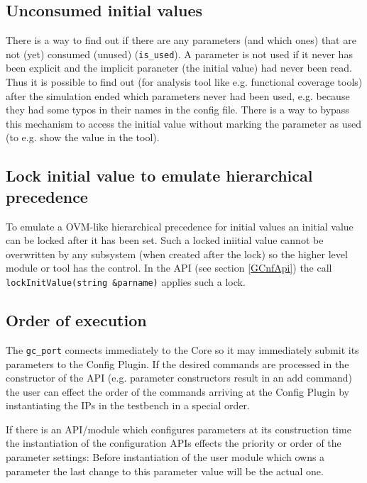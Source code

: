 \subsection{Unconsumed initial values}
There is a way to find out if there are any parameters (and which ones) that are not (yet) consumed (unused) (\lstinline|is_used|). A parameter is not used if it never has been explicit and the implicit paraneter (the initial value) had never been read. Thus it is possible to find out (for analysis tool like e.g. functional coverage tools) after the simulation ended which parameters never had been used, e.g. because they had some typos in their names in the config file. There is a way to bypass this mechanism to access the initial value without marking the parameter as used (to e.g. show the value in the tool).

\subsection{Lock initial value to emulate hierarchical precedence}
\label{ParamInitValueLock}
To emulate a OVM-like hierarchical precedence for initial values an initial value can be locked after it has been set.
Such a locked iniitial value cannot be overwritten by any subsystem (when created after the lock) so the higher level module or tool has the control. In the \GreenConfig API (see section \ref{GCnfApi}) the call \lstinline|lockInitValue(string &parname)| applies such a lock.

\subsection{Order of execution}
\label{OrderOfExecution}
The \lstinline|gc_port| connects immediately to the Core so it may immediately submit its parameters
to the Config Plugin. If the desired commands are processed in the constructor of the API
(e.g. parameter constructors result in an add command) the user can effect the order of the commands
arriving at the Config Plugin by instantiating the IPs in the testbench in a special order. 

If there is an API/module which configures parameters at its construction time the instantiation of the configuration APIs effects the priority or order of the parameter settings: Before instantiation of the user module which owns a parameter the last change to this parameter value will be the actual one.


